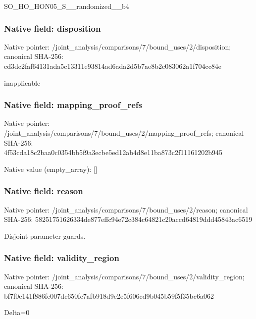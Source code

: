 \documentclass[10pt,a4paper]{article}
\begin{document}
\begingroup\raggedright\sloppy SO\_\allowbreak{}HO\_\allowbreak{}HON05\_\allowbreak{}S\_\allowbreak{}\_\allowbreak{}randomized\_\allowbreak{}\_\allowbreak{}b4\par\endgroup

\subsubsection{Native field: disposition}
Native pointer: /joint\_\allowbreak{}analysis/comparisons/7/bound\_\allowbreak{}uses/2/disposition; canonical SHA-256: cd3dc2faf64131ada5c13311e93814ad6ada2d5b7ae8b2c083062a1f704cc84e

\begingroup\raggedright\sloppy inapplicable\par\endgroup

\subsubsection{Native field: mapping\_\allowbreak{}proof\_\allowbreak{}refs}
Native pointer: /joint\_\allowbreak{}analysis/comparisons/7/bound\_\allowbreak{}uses/2/mapping\_\allowbreak{}proof\_\allowbreak{}refs; canonical SHA-256: 4f53cda18c2baa0c0354bb5f9a3ecbe5ed12ab4d8e11ba873c2f11161202b945

Native value (empty\_\allowbreak{}array): []

\subsubsection{Native field: reason}
Native pointer: /joint\_\allowbreak{}analysis/comparisons/7/bound\_\allowbreak{}uses/2/reason; canonical SHA-256: 58251751626334de877effc94e72c384c64821c20accd64819ddd45843ac6519

\begingroup\raggedright\sloppy Disjoint parameter guards.\par\endgroup

\subsubsection{Native field: validity\_\allowbreak{}region}
Native pointer: /joint\_\allowbreak{}analysis/comparisons/7/bound\_\allowbreak{}uses/2/validity\_\allowbreak{}region; canonical SHA-256: bf7f0e141f886fe007dc650fe7afb918d9e2e5f606cd9b045b59f5f35bc6a062

\begingroup\raggedright\sloppy Delta=\allowbreak{}0\par\endgroup
\end{document}

